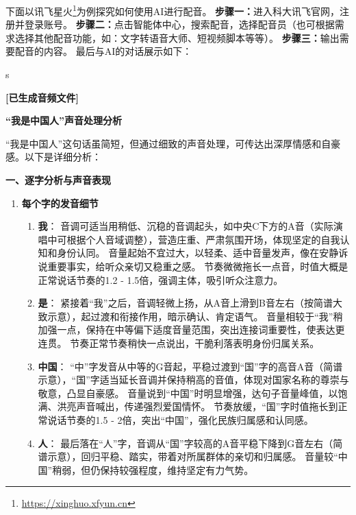 下面以讯飞星火\footnote{\url{https://xinghuo.xfyun.cn}}为例探究如何使用AI进行配音。
\textbf{步骤一：}进入科大讯飞官网，注册并登录账号。
\textbf{步骤二：}点击智能体中心，搜索配音，选择配音员（也可根据需求选择其他配音功能，如：文字转语音大师、短视频脚本等等）。
\textbf{步骤三：}输出需要配音的内容。
最后与AI的对话展示如下：


\begin{gptbox}
s \footnotesize{
    \textbf{[已生成音频文件]}

    \textbf{“我是中国人”声音处理分析}

    “我是中国人”这句话虽简短，但通过细致的声音处理，可传达出深厚情感和自豪感。以下是详细分析：

    \textbf{一、逐字分析与声音表现}
    \begin{enumerate}
        \item \textbf{每个字的发音细节}
              \begin{enumerate}
                  \item \textbf{我}：
                        音调可适当用稍低、沉稳的音调起头，如中央C下方的A音（实际演唱中可根据个人音域调整），营造庄重、严肃氛围开场，体现坚定的自我认知和身份认同。
                        音量起始不宜过大，以轻柔、适中音量发声，像在安静诉说重要事实，给听众亲切又稳重之感。
                        节奏微微拖长一点音，时值大概是正常说话节奏的1.2 - 1.5倍，强调主体，吸引听众注意力。
                  \item \textbf{是}：
                        紧接着“我”之后，音调轻微上扬，从A音上滑到B音左右（按简谱大致示意），起过渡和衔接作用，暗示确认、肯定语气。
                        音量相较于“我”稍加强一点，保持在中等偏下适度音量范围，突出连接词重要性，使表达更连贯。
                        节奏正常节奏稍快一点说出，干脆利落表明身份归属关系。
                  \item \textbf{中国}：
                        “中”字发音从中等的G音起，平稳过渡到“国”字的高音A音（简谱示意），“国”字适当延长音调并保持稍高的音值，体现对国家名称的尊崇与敬意，凸显自豪感。
                        音量说到“中国”时明显增强，达句子音量峰值，以饱满、洪亮声音喊出，传递强烈爱国情怀。
                        节奏放缓，“国”字时值拖长到正常说话节奏的1.5 - 2倍，突出“中国”，强化民族归属感和认同感。
                  \item \textbf{人}：
                        最后落在“人”字，音调从“国”字较高的A音平稳下降到G音左右（简谱示意），回归平稳、踏实，带着对所属群体的亲切和归属感。
                        音量较“中国”稍弱，但仍保持较强程度，维持坚定有力气势。

\end{enumerate}
\end{enumerate}}
\end{gptbox}
